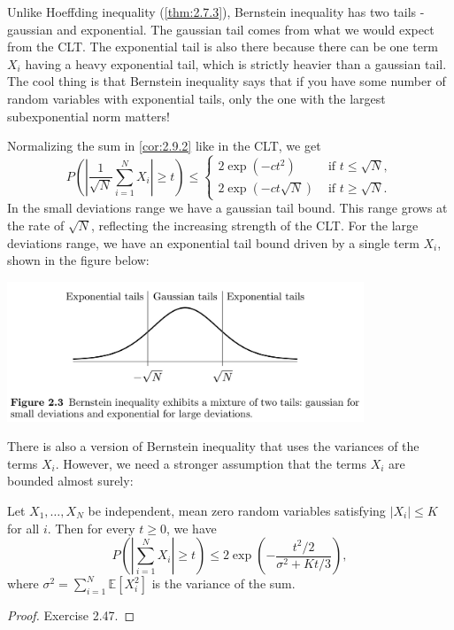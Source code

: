 \begin{remark}
\label{rmk:2.9.3}
Unlike Hoeffding inequality (\cref{thm:2.7.3}), Bernstein inequality has two tails - gaussian and exponential. 
The gaussian tail comes from what we would expect from the CLT. The exponential tail is also there because 
there can be one term $X_i$ having a heavy exponential tail, which is strictly heavier than a gaussian tail. 
The cool thing is that Bernstein inequality says that if you have some number of random variables with 
exponential tails, only the one with the largest subexponential norm matters!
\end{remark}

\begin{remark}
\label{rmk:2.9.4}
Normalizing the sum in \cref{cor:2.9.2} like in the CLT, we get 
\[ P \left( \left| \frac{1}{\sqrt{N}} \sum_{i = 1}^{N} X_i \right| \geq t \right) \leq \begin{cases}
	2 \exp{(-ct^2)} &\text{ if } t \leq \sqrt{N}, \\
	2 \exp{(-ct \sqrt{N})} &\text{ if } t \geq \sqrt{N}.
\end{cases} \]
In the small deviations range we have a gaussian tail bound. This range grows at the rate of $\sqrt{N}$, 
reflecting the increasing strength of the CLT. For the large deviations range, we have an exponential 
tail bound driven by a single term $X_i$, shown in the figure below:
\begin{center}
	\includegraphics[width=0.8\textwidth]{Chapter 2/fig2-3.png}
\end{center}
\end{remark}

There is also a version of Bernstein inequality that uses the variances of the terms $X_i$. However, we need 
a stronger assumption that the terms $X_i$ are bounded almost surely: 

\begin{theorem}
\label{thm:2.9.5}
Let $X_1, \dots, X_N$ be independent, mean zero random variables satisfying $|X_i| \leq K$ for all $i$. 
Then for every $t \geq 0$, we have 
\[ P \left( \left| \sum_{i = 1}^{N} X_i \right| \geq t \right) 
\leq 2 \exp{\left( -\frac{t^2 / 2}{\sigma^2 + Kt / 3} \right)}, \]
where $\sigma^2 = \sum_{i = 1}^{N}\mathbb{E}[X_i^2]$ is the variance of the sum.
\end{theorem}

\begin{proof}
Exercise 2.47.
\end{proof}
